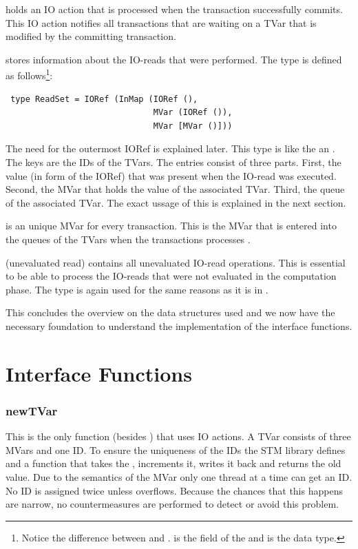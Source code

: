  holds an IO action that is processed when the transaction successfully commits.
This IO action notifies all transactions that are waiting on a TVar that is modified by the 
committing transaction.

 stores information about the IO-reads that were performed. The type 
is defined as follows\footnote{Notice the difference between 
 and .  is the field of the  and 
 is the data type.}:
\begin{lstlisting}
 type ReadSet = IORef (InMap (IORef (), 
                              MVar (IORef ()), 
                              MVar [MVar ()]))
\end{lstlisting}
The need for the outermost IORef is explained later. This type is like the  an 
. The keys are the IDs of the TVars. The entries consist of three parts. First,
the value (in form of the IORef) that was present when the IO-read was executed. Second, the 
MVar that holds the value of the associated TVar. Third, the queue of the associated TVar.
The exact ussage of this is explained in the next section.

 is an unique MVar for every transaction. This is the MVar that is entered into
the queues of the TVars when the transactions processes .

(unevaluated read) contains all unevaluated IO-read operations. This is essential to be able to 
process the IO-reads that were not evaluated in the computation phase. The  type
is again used for the same reasons as it is in .

This concludes the overview on the data structures used and we now have the necessary foundation
to understand the implementation of the interface functions.

\section{Interface Functions}
\label{sec:IFFun}

\subsubsection{newTVar}
\label{sec:newTVar}
This is the only function (besides ) that uses IO actions. A TVar consists of three MVars
and one ID. To ensure the uniqueness of the IDs the STM library defines 
and a function  that takes the , increments it, writes it back 
and returns the old value. Due to the semantics of the MVar only one thread at a time can get an ID. 
No ID is assigned twice unless  overflows. Because the chances that this happens 
are narrow, no countermeasures are performed to detect or avoid this problem. 

